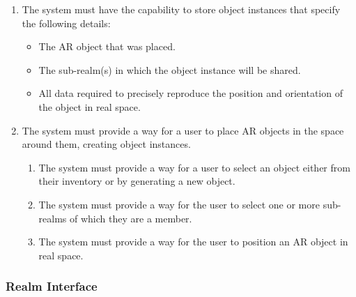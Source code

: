 \documentclass{article}
\begin{document}
\begin{enumerate}[align=left, label=\textbf{OP-FR\arabic*:}]
    \item The system must have the capability to store object instances that specify the following details:
          \begin{itemize}
              \item The AR object that was placed.
              \item The sub-realm(s) in which the object instance will be shared.
              \item All data required to precisely reproduce the position and orientation of the object in real space.
          \end{itemize}

    \item The system must provide a way for a user to place AR objects in the space around them, creating object instances.
          \begin{enumerate}[align=left, label=\textbf{OP-FR2.\arabic*:}]
              \item The system must provide a way for a user to select an object either from their inventory or by generating a new object.
              \item The system must provide a way for the user to select one or more sub-realms of which they are a member.
              \item The system must provide a way for the user to position an AR object in real space.
          \end{enumerate}
\end{enumerate}

\subsubsection{Realm Interface}
\label{ssub:realm_interface}
\end{document}
